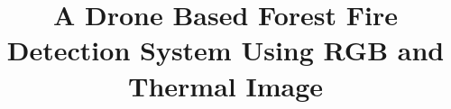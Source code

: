\documentclass[conference]{IEEEtran}
\begin{document}
\title{A Drone Based Forest Fire Detection System Using RGB and Thermal
Image}



\maketitle







\end{document}
